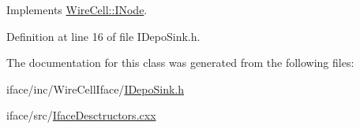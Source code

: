 Implements \hyperlink{class_wire_cell_1_1_i_node_a0b0763465adf5ba7febe8e378162b584}{Wire\+Cell\+::\+I\+Node}.



Definition at line 16 of file I\+Depo\+Sink.\+h.



The documentation for this class was generated from the following files\+:\begin{DoxyCompactItemize}
\item 
iface/inc/\+Wire\+Cell\+Iface/\hyperlink{_i_depo_sink_8h}{I\+Depo\+Sink.\+h}\item 
iface/src/\hyperlink{_iface_desctructors_8cxx}{Iface\+Desctructors.\+cxx}\end{DoxyCompactItemize}
